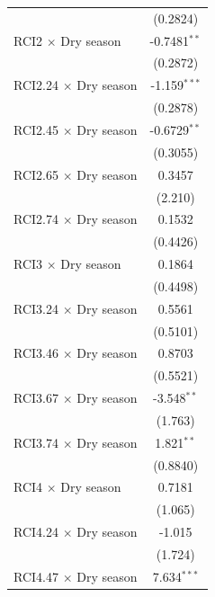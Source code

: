 \begin{table}[H]
\begin{tabular}{lc}
                                            & (0.2824)\\   
      RCI2 $\times$ Dry season              & -0.7481$^{**}$\\   
                                            & (0.2872)\\   
      RCI2.24 $\times$ Dry season           & -1.159$^{***}$\\   
                                            & (0.2878)\\   
      RCI2.45 $\times$ Dry season           & -0.6729$^{**}$\\   
                                            & (0.3055)\\   
      RCI2.65 $\times$ Dry season           & 0.3457\\   
                                            & (2.210)\\   
      RCI2.74 $\times$ Dry season           & 0.1532\\   
                                            & (0.4426)\\   
      RCI3 $\times$ Dry season              & 0.1864\\   
                                            & (0.4498)\\   
      RCI3.24 $\times$ Dry season           & 0.5561\\   
                                            & (0.5101)\\   
      RCI3.46 $\times$ Dry season           & 0.8703\\   
                                            & (0.5521)\\   
      RCI3.67 $\times$ Dry season           & -3.548$^{**}$\\   
                                            & (1.763)\\   
      RCI3.74 $\times$ Dry season           & 1.821$^{**}$\\   
                                            & (0.8840)\\   
      RCI4 $\times$ Dry season              & 0.7181\\   
                                            & (1.065)\\   
      RCI4.24 $\times$ Dry season           & -1.015\\   
                                            & (1.724)\\   
      RCI4.47 $\times$ Dry season           & 7.634$^{***}$\\   

\end{tabular}
\end{table}
